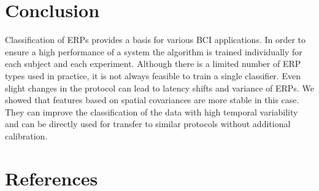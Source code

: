 \documentclass[12pt]{iopart}
\begin{document}
\section{Conclusion}
Classification of ERPs provides a basis for various BCI applications.
In order to ensure a high performance of a system the algorithm
is trained individually for each subject and each experiment.
Although there is a limited number of ERP types used in practice,
it is not always feasible to train a single classifier. 
Even slight changes in the protocol can lead to latency shifts
and variance of ERPs. We showed that features based on 
spatial covariances are more stable in this case. They can
improve the classification of the data with high temporal variability
and can be directly used for transfer to similar protocols
without additional calibration.


\section*{References}



\end{document}
